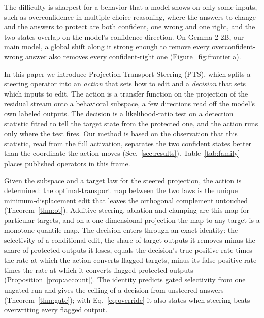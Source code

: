 \documentclass{article}
\begin{document}
The difficulty is sharpest for a behavior that a model shows on only some
inputs, such as overconfidence in multiple-choice reasoning, where the answers
to change and the answers to protect are both confident, one wrong and one
right, and the two states overlap on the model's confidence direction. On
Gemma-2-2B, our main model, a global shift along it strong enough to remove
every overconfident-wrong answer also removes every confident-right one
(Figure~\ref{fig:frontier}a).

In this paper we introduce Projection-Transport Steering (PTS), which splits a
steering operator into an \emph{action} that sets how to edit and a
\emph{decision} that sets which inputs to edit. The action is a transfer
function on the projection of the residual stream onto a behavioral subspace,
a few directions read off the model's own labeled outputs. The decision is a
likelihood-ratio test on a detection statistic fitted to tell the target state
from the protected one, and the action runs only where the test fires. Our
method is based on the observation that this statistic, read from the full
activation, separates the two confident states better than the coordinate the
action moves (Sec.~\ref{sec:results}). Table~\ref{tab:family} places
published operators in this frame.

Given the subspace and a target law for the steered projection, the action is
determined: the optimal-transport map between the two laws is the unique
minimum-displacement edit that leaves the orthogonal complement untouched
(Theorem~\ref{thm:ot}). Additive steering, ablation and clamping are this map
for particular targets, and on a one-dimensional projection the map to any
target is a monotone quantile map. The decision enters through an exact
identity: the selectivity of a conditional edit, the share of target outputs it
removes minus the share of protected outputs it loses, equals the decision's
true-positive rate times the rate at which the action converts flagged targets,
minus its false-positive rate times the rate at which it converts flagged
protected outputs (Proposition~\ref{prop:account}). The identity predicts gated
selectivity from one ungated run and gives the ceiling of a decision from
unsteered answers (Theorem~\ref{thm:gate}); with Eq.~\eqref{eq:override} it
also states when steering beats overwriting every flagged output.
\end{document}
